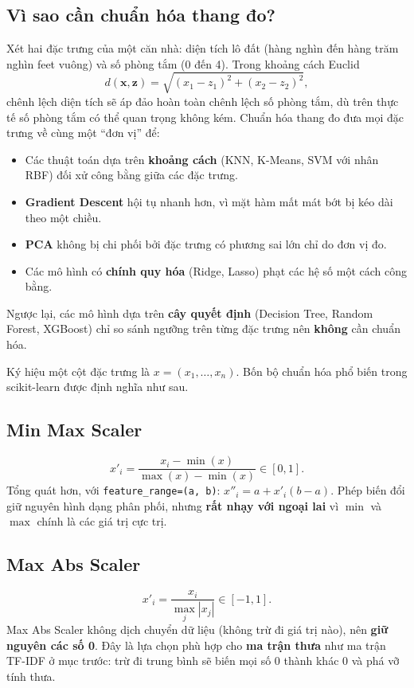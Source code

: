 \subsection{Vì sao cần chuẩn hóa thang đo?}

Xét hai đặc trưng của một căn nhà: diện tích lô đất (hàng nghìn đến hàng trăm nghìn feet vuông) và số phòng tắm (0 đến 4). Trong khoảng cách Euclid
\begin{equation}
    d(\mathbf{x}, \mathbf{z}) = \sqrt{(x_1 - z_1)^2 + (x_2 - z_2)^2},
\end{equation}
chênh lệch diện tích sẽ áp đảo hoàn toàn chênh lệch số phòng tắm, dù trên thực tế số phòng tắm có thể quan trọng không kém. Chuẩn hóa thang đo đưa mọi đặc trưng về cùng một ``đơn vị'' để:
\begin{itemize}
    \item Các thuật toán dựa trên \textbf{khoảng cách} (KNN, K-Means, SVM với nhân RBF) đối xử công bằng giữa các đặc trưng.
    \item \textbf{Gradient Descent} hội tụ nhanh hơn, vì mặt hàm mất mát bớt bị kéo dài theo một chiều.
    \item \textbf{PCA} không bị chi phối bởi đặc trưng có phương sai lớn chỉ do đơn vị đo.
    \item Các mô hình có \textbf{chính quy hóa} (Ridge, Lasso) phạt các hệ số một cách công bằng.
\end{itemize}
Ngược lại, các mô hình dựa trên \textbf{cây quyết định} (Decision Tree, Random Forest, XGBoost) chỉ so sánh ngưỡng trên từng đặc trưng nên \textbf{không} cần chuẩn hóa.

Ký hiệu một cột đặc trưng là $x = (x_1, \dots, x_n)$. Bốn bộ chuẩn hóa phổ biến trong scikit-learn được định nghĩa như sau.

\subsection{Min Max Scaler}
\begin{equation}
    x'_i = \frac{x_i - \min(x)}{\max(x) - \min(x)} \in [0, 1].
\end{equation}
Tổng quát hơn, với \texttt{feature\_range=(a, b)}: $x''_i = a + x'_i (b - a)$. Phép biến đổi giữ nguyên hình dạng phân phối, nhưng \textbf{rất nhạy với ngoại lai} vì $\min$ và $\max$ chính là các giá trị cực trị.

\subsection{Max Abs Scaler}
\begin{equation}
    x'_i = \frac{x_i}{\max_j |x_j|} \in [-1, 1].
\end{equation}
Max Abs Scaler không dịch chuyển dữ liệu (không trừ đi giá trị nào), nên \textbf{giữ nguyên các số 0}. Đây là lựa chọn phù hợp cho \textbf{ma trận thưa} như ma trận TF-IDF ở mục trước: trừ đi trung bình sẽ biến mọi số 0 thành khác 0 và phá vỡ tính thưa.

